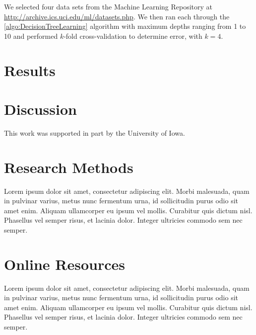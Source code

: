 \documentclass[screen, authorversion, nonacm, sigconf]{acmart}
\begin{document}
We selected four data sets from the Machine Learning Repository at \url{http://archive.ics.uci.edu/ml/datasets.php}. We then ran each through the \ref{algo:DecisionTreeLearning} algorithm with maximum depths ranging from 1 to 10 and performed $k$-fold cross-validation to determine error, with $k = 4$.

\section{Results}

\section{Discussion}

\begin{acks}
This work was supported in part by the University of Iowa.
\end{acks}




\appendix

\section{Research Methods}

Lorem ipsum dolor sit amet, consectetur adipiscing elit. Morbi malesuada, quam in pulvinar varius, metus nunc fermentum urna, id sollicitudin purus odio sit amet enim. Aliquam ullamcorper eu ipsum vel mollis. Curabitur quis dictum nisl. Phasellus vel semper risus, et lacinia dolor. Integer ultricies commodo sem nec semper.

\section{Online Resources}

Lorem ipsum dolor sit amet, consectetur adipiscing elit. Morbi malesuada, quam in pulvinar varius, metus nunc fermentum urna, id sollicitudin purus odio sit amet enim. Aliquam ullamcorper eu ipsum vel mollis. Curabitur quis dictum nisl. Phasellus vel semper risus, et lacinia dolor. Integer ultricies commodo sem nec semper.
\end{document}
